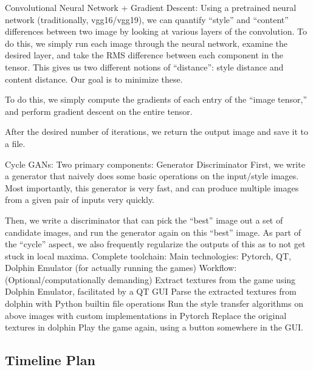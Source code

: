 \documentclass[12pt]{article}
\begin{document}
Convolutional Neural Network + Gradient Descent:
Using a pretrained neural network (traditionally, vgg16/vgg19), we can quantify “style” and “content” differences between two image by looking at various layers of the convolution. To do this, we simply run each image through the neural network, examine the desired layer, and take the RMS difference between each component in the tensor. 
This gives us two different notions of “distance”: style distance and content distance. Our goal is to minimize these. 

To do this, we simply compute the gradients of each entry of the “image tensor,” and perform gradient descent on the entire tensor. 

After the desired number of iterations, we return the output image and save it to a file.

Cycle GANs:
Two primary components:
Generator 
Discriminator
First, we write a generator that naively does some basic operations on the input/style images. Most importantly, this generator is very fast, and can produce multiple images from a given pair of inputs very quickly. 

Then, we write a discriminator that can pick the “best” image out a set of candidate images, and run the generator again on this “best” image. As part of the “cycle” aspect, we also frequently regularize the outputs of this as to not get stuck in local maxima. 
Complete toolchain:
Main technologies: Pytorch, QT, Dolphin Emulator (for actually running the games)
Workflow: 
(Optional/computationally demanding) Extract textures from the game using Dolphin Emulator, facilitated by a QT GUI
Parse the extracted textures from dolphin with Python builtin file operations
Run the style transfer algorithms on above images with custom implementations in Pytorch
Replace the original textures in dolphin
Play the game again, using a button somewhere in the GUI.

\subsection{Timeline Plan}
\end{document}
